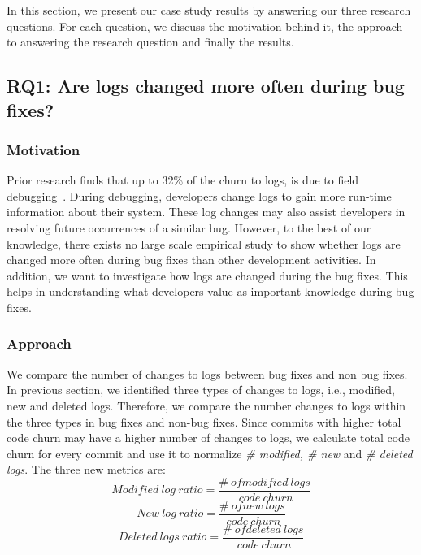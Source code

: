 	In this section, we present our case study results by answering our three research questions. For each question, we discuss the motivation behind it, the approach to answering the research question and finally the results.

\subsection*{\textbf{RQ1: Are logs changed more often during bug fixes?}}


\subsubsection*{\textbf{Motivation}}

Prior research finds that up to 32\% of the churn to logs, is due to field debugging~\cite{EMSEIAN}. During debugging, developers change logs to gain more run-time information about their system. These log changes may also assist developers in resolving future occurrences of a similar bug. However, to the best of our knowledge, there exists no large scale empirical study to show whether logs are changed more often during bug fixes than other development activities. In addition, we want to investigate how logs are changed during the bug fixes. This helps in understanding what developers value as important knowledge during bug fixes.

\subsubsection*{\textbf{Approach}}

We compare the number of changes to logs between bug fixes and non bug fixes. In previous section, we identified three types of changes to logs, i.e., modified, new and deleted logs. Therefore, we compare the number changes to logs within the three types in bug fixes and non-bug fixes. Since commits with higher total code churn may have a higher number of changes to logs, we calculate total code churn for every commit and use it to normalize \emph{\# modified, \# new} and \emph{\# deleted logs}. The three new metrics are:
\begin{equation}
Modified\ log\ ratio = \frac{\#\ of modified\ logs}{\ code\ churn } 
\label{eq1}
\end{equation}
\begin{equation}
New\ log\  ratio = \frac{\#\ of new\ logs}{\ code\ churn } 
\label{eq2}
\end{equation}
\begin{equation}
Deleted\ logs\ ratio = \frac{\#\ of deleted\ logs}{\ code\ churn }
\label{eq3} 
\end{equation}

